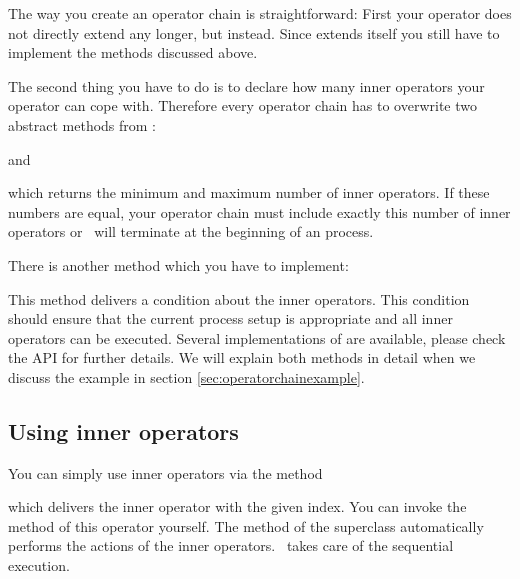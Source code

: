The way you create an operator chain is straightforward: First your
operator does not directly extend  any longer, 
but 
instead. Since  extends  itself you still have to
implement the methods discussed above. 


The second thing you have to do is to declare how many inner operators
your operator can cope with. Therefore every operator chain has to
overwrite two abstract methods from :
\begin{center}
\end{center}
and
\begin{center}
\end{center}
which returns the minimum and maximum number of inner operators. If
these numbers are equal, your operator chain must include exactly this number
of inner operators or \rapidminer\ will terminate at the beginning of an
process. 


There is another method which you have to implement:
\begin{center}
\end{center}
This method delivers a condition about the inner operators. This condition should
ensure that the current process setup is appropriate and all inner
operators can be executed. Several implementations of
 are available, please check the API for further
details. We will explain both methods in detail when we discuss the example in
section \ref{sec:operatorchainexample}.



\subsection{Using inner operators}

You can simply use inner operators via the method 
\begin{center}
\end{center}
which delivers the inner operator with the given index. You can invoke the
 method of this operator yourself. The  method of the
superclass automatically performs the actions of the inner operators. \rapidminer\
takes care of the sequential execution.



